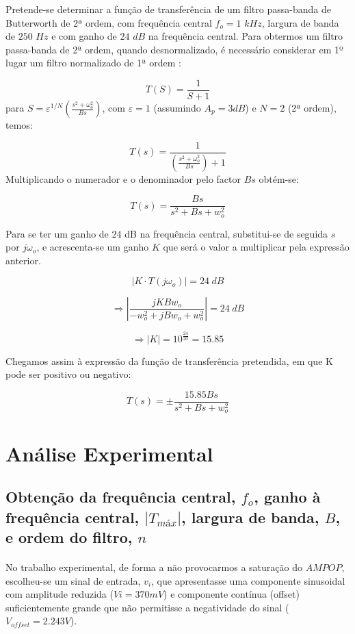 \documentclass[a4paper,11pt]{report}
\begin{document}
\indent{} Pretende-se determinar a função de transferência de um filtro passa-banda de Butterworth de 2ª ordem, com frequência central $f_o=1$ $kHz$, largura de banda de $250$ $Hz$ e com ganho de $24$ $dB$ na frequência central. Para obtermos um filtro passa-banda de 2ª ordem, quando desnormalizado, é necessário considerar em 1º lugar um filtro normalizado de 1ª ordem :

$$
T(S)=\frac{1}{S+1}
$$
para $S=\varepsilon^{1/N}\left(\frac{s^2+\omega_o^2}{Bs}\right)$, com $\varepsilon = 1$ (assumindo $A_p=3dB$) e $N=2$ (2ª ordem), temos:

$$
T(s)=\frac{1}{\left(\frac{s^2+\omega_o^2}{Bs}\right)+1}
$$
Multiplicando o numerador e o denominador pelo factor $Bs$ obtém-se:

$$
T(s)=\frac{Bs}{s^2+Bs+w_o^2}
$$

Para se ter um ganho de $24$ dB na frequência central, substitui-se de seguida $s$ por $j\omega_o$, e acrescenta-se um ganho $K$ que será o valor a multiplicar pela expressão anterior.

$$
\left|K\cdot T(j\omega_o)\right|=24\hspace{3pt}dB
$$

$$
\Rightarrow\left|\frac{jKBw_o}{-w_o^2+jBw_o+w_o^2}\right|=24\hspace{3pt}dB
$$

$$
\Rightarrow \left|K\right|=10^{\frac{24}{20}}=15.85
$$

Chegamos assim à expressão da função de transferência pretendida, em que K pode ser positivo ou negativo:

\begin{equation}\label{eq:rauch}
T(s)=\pm \frac{15.85Bs}{s^2+Bs+w_o^2}
\end{equation}


\section{Análise Experimental}

\subsection{Obtenção da frequência central, $f_o$, ganho à frequência central, $\left|T_{máx}\right|$, largura de banda, $B$, e ordem do filtro, $n$}

\paragraph{}No trabalho experimental, de forma a não provocarmos a saturação do $AMPOP$, escolheu-se um sinal de entrada, $v_i$, que apresentasse uma componente sinusoidal com amplitude reduzida ($Vi=370mV$) e componente contínua (offset) suficientemente grande que não permitisse a negatividade do sinal ($V_{offset}=2.243V$).
\end{document}
